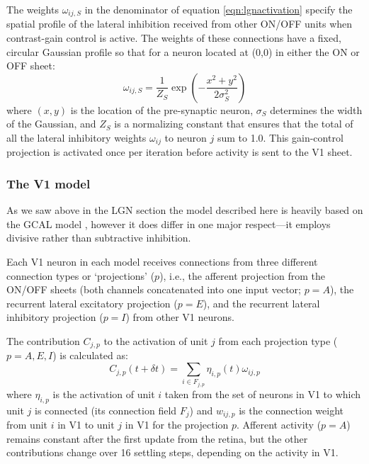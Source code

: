 The weights $\omega_{ij, S}$ in the denominator of equation
\ref{eqn:lgnactivation} specify the spatial profile of the lateral
inhibition received from other ON/OFF units when contrast-gain control
is active. The weights of these connections have a fixed, circular
Gaussian profile so that for a neuron located at (0,0) in either the
ON or OFF sheet:
\begin{equation}
\omega_{ij,S}=\frac{1}{Z_S}\exp\left(-\frac{x^{2}+y^{2}}{2\sigma_{S}^{2}}\right)
\label{eqn:gauss}
\end{equation}
where $(x, y)$ is the location of the pre-synaptic neuron, $\sigma_{S}$
determines the width of the Gaussian, and $Z_S$ is a normalizing
constant that ensures that the total of all the lateral inhibitory
weights $\omega_{ij}$ to neuron $j$ sum to 1.0. This gain-control
projection is activated once per iteration before activity is sent to
the V1 sheet.

\subsubsection{The V1 model}

As we saw above in the LGN section the model described here is heavily
based on the GCAL model \citep{Stevens2013}, however it does differ in
one major respect---it employs divisive rather than subtractive
inhibition.

Each V1 neuron in each model receives connections from three different
connection types or `projections' ($p$), i.e., the afferent projection
from the ON/OFF sheets (both channels concatenated into one input
vector; $p=A$), the recurrent lateral excitatory projection ($p=E$),
and the recurrent lateral inhibitory projection ($p=I$) from other V1
neurons.

The contribution $C_{j,p}$ to the activation of unit $j$ from each
projection type ($p=A,E,I$) is calculated as:
\begin{equation}
C_{j,p}(t+\delta t)=\sum_{i\in F_{j,p}}\eta_{i, p}(t)\omega_{ij,p}
\label{eqn:update}
\end{equation}
where $\eta_{i, p}$ is the activation of unit $i$ taken from the set
of neurons in V1 to which unit $j$ is connected (its connection field
$F_j$) and $w_{ij,p}$ is the connection weight from unit $i$ in V1 to
unit $j$ in V1 for the projection $p$. Afferent activity ($p=A$)
remains constant after the first update from the retina, but the other
contributions change over 16 settling steps, depending on the activity
in V1.

